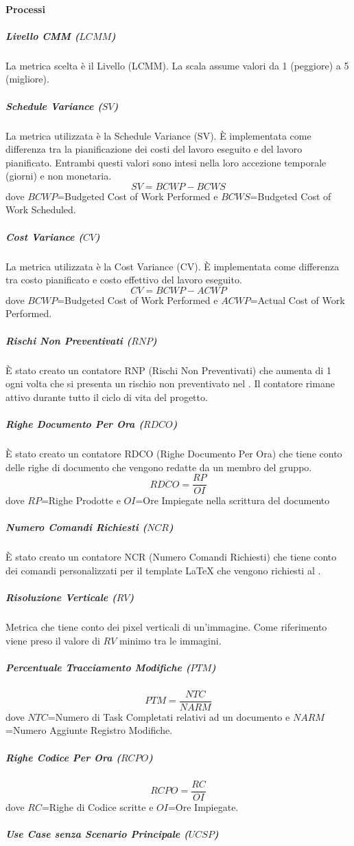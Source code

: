 			\paragraph{Processi}
				\subparagraph{Livello CMM ($LCMM$)} \label{LCMM}
				La metrica scelta è il Livello  (LCMM). La scala assume valori da 1 (peggiore) a 5 (migliore).
				\subparagraph{Schedule Variance ($SV$)} \label{SV}
				La metrica utilizzata è la Schedule Variance (SV). È implementata come differenza tra la pianificazione dei costi del lavoro eseguito e del lavoro pianificato. Entrambi questi valori sono intesi nella loro accezione temporale (giorni) e non monetaria.
				$$SV = BCWP-BCWS$$
				dove $BCWP$=Budgeted Cost of Work Performed e $BCWS$=Budgeted Cost of Work Scheduled.
				\subparagraph{Cost Variance ($CV$)} \label{CV}
				La metrica utilizzata è la Cost Variance (CV). È implementata come differenza tra costo pianificato e costo effettivo del lavoro eseguito.
				$$CV = BCWP-ACWP$$ dove $BCWP$=Budgeted Cost of Work Performed e $ACWP$=Actual Cost of Work Performed.
				\subparagraph{Rischi Non Preventivati ($RNP$)} \label{RNP}
				È stato creato un contatore RNP (Rischi Non Preventivati) che aumenta di 1 ogni volta che si presenta un rischio non preventivato nel \pdpv. Il contatore rimane attivo durante tutto il ciclo di vita del progetto.
				\subparagraph{Righe Documento Per Ora ($RDCO$)} \label{RDCO}
				È stato creato un contatore RDCO (Righe Documento Per Ora) che tiene conto delle righe di documento che vengono redatte da un membro del gruppo.
				$$RDCO=\frac{RP}{OI}$$ dove $RP$=Righe Prodotte e $OI$=Ore Impiegate nella scrittura del documento
				\subparagraph{Numero Comandi Richiesti ($NCR$)} \label{NCR}
				È stato creato un contatore NCR (Numero Comandi Richiesti) che tiene conto dei comandi personalizzati per il template \LaTeX{} che vengono richiesti al \responsabilediprogetto.
				\subparagraph{Risoluzione Verticale ($RV$)} \label{RV}
				Metrica che tiene conto dei pixel verticali di un'immagine.
				Come riferimento viene preso il valore di $RV$ minimo tra le immagini.
				\subparagraph{Percentuale Tracciamento Modifiche ($PTM$)} \label{PTM}
				$$PTM=\frac{NTC}{NARM}$$
				dove $NTC$=Numero di Task Completati relativi ad un documento e $NARM$=Numero Aggiunte Registro Modifiche.
				\subparagraph{Righe Codice Per Ora ($RCPO$)} \label{RCPO}
				$$RCPO=\frac{RC}{OI}$$
				dove $RC$=Righe di Codice scritte e $OI$=Ore Impiegate.
				\subparagraph{Use Case senza Scenario Principale ($UCSP$)} \label{UCSP}
